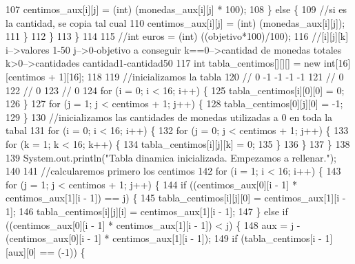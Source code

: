 \begin{DoxyCode}
107                     centimos\_aux[i][j] = (int) (monedas\_aux[i][j] * 100);
108                 \} \textcolor{keywordflow}{else} \{
109                     \textcolor{comment}{//si es la cantidad, se copia tal cual}
110                     centimos\_aux[i][j] = (int) (monedas\_aux[i][j]);
111                 \}
112             \}
113         \}
114 
115         \textcolor{comment}{//int euros = (int) ((objetivo*100)/100);}
116         \textcolor{comment}{//[i][j][k]   i-->valores 1-50   j-->0-objetivo a conseguir   k==0-->cantidad de monedas totales   
       k>0-->cantidades cantidad1-cantidad50}
117         \textcolor{keywordtype}{int} tabla\_centimos[][][] = \textcolor{keyword}{new} \textcolor{keywordtype}{int}[16][centimos + 1][16];
118 
119         \textcolor{comment}{//inicializamos la tabla }
120         \textcolor{comment}{//  0   -1  -1  -1  -1}
121         \textcolor{comment}{//  0}
122         \textcolor{comment}{//  0}
123         \textcolor{comment}{//  0}
124         \textcolor{keywordflow}{for} (i = 0; i < 16; i++) \{
125             tabla\_centimos[i][0][0] = 0;
126         \}
127         \textcolor{keywordflow}{for} (j = 1; j < centimos + 1; j++) \{
128             tabla\_centimos[0][j][0] = -1;
129         \}
130         \textcolor{comment}{//inicializamos las cantidades de monedas utilizadas a 0 en toda la tabal}
131         \textcolor{keywordflow}{for} (i = 0; i < 16; i++) \{
132             \textcolor{keywordflow}{for} (j = 0; j < centimos + 1; j++) \{
133                 \textcolor{keywordflow}{for} (k = 1; k < 16; k++) \{
134                     tabla\_centimos[i][j][k] = 0;
135                 \}
136             \}
137         \}
138         
139         System.out.println(\textcolor{stringliteral}{"Tabla dinamica inicializada. Empezamos a rellenar."});
140 
141         \textcolor{comment}{//calcularemos primero los centimos}
142         \textcolor{keywordflow}{for} (i = 1; i < 16; i++) \{
143             \textcolor{keywordflow}{for} (j = 1; j < centimos + 1; j++) \{
144                 \textcolor{keywordflow}{if} ((centimos\_aux[0][i - 1] * centimos\_aux[1][i - 1]) == j) \{
145                     tabla\_centimos[i][j][0] = centimos\_aux[1][i - 1];
146                     tabla\_centimos[i][j][i] = centimos\_aux[1][i - 1];
147                 \} \textcolor{keywordflow}{else} \textcolor{keywordflow}{if} ((centimos\_aux[0][i - 1] * centimos\_aux[1][i - 1]) < j) \{
148                     aux = j - (centimos\_aux[0][i - 1] * centimos\_aux[1][i - 1]);
149                     \textcolor{keywordflow}{if} (tabla\_centimos[i - 1][aux][0] == (-1)) \{

\end{DoxyCode}
